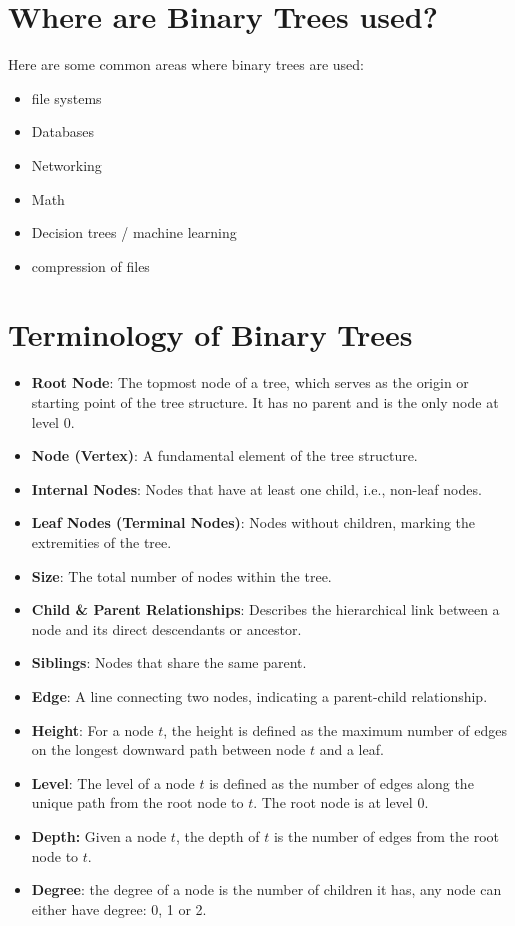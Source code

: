 \documentclass{report}
\begin{document}
\section{Where are Binary Trees used?}
Here are some common areas where binary trees are used:
\begin{itemize}
  \item file systems
  \item Databases
  \item Networking
  \item Math
  \item Decision trees / machine learning
  \item compression of files
\end{itemize}
\newpage
\section{Terminology of Binary Trees}
\begin{itemize}
  \item \textbf{Root Node}: The topmost node of a tree, which serves as the origin or starting point of the tree structure. It has no parent and is the only node at level 0.
  \item \textbf{Node (Vertex)}: A fundamental element of the tree structure.
  \item \textbf{Internal Nodes}: Nodes that have at least one child, i.e., non-leaf nodes.
  \item \textbf{Leaf Nodes (Terminal Nodes)}: Nodes without children, marking the extremities of the tree.
  \item \textbf{Size}: The total number of nodes within the tree.
  \item \textbf{Child \& Parent Relationships}: Describes the hierarchical link between a node and its direct descendants or ancestor.
  \item \textbf{Siblings}: Nodes that share the same parent.
  \item \textbf{Edge}: A line connecting two nodes, indicating a parent-child relationship.
  \item \textbf{Height}: For a node \(t\), the height is defined as the maximum number of edges on the longest downward path between node \(t\) and a leaf.
  \item \textbf{Level}: The level of a node \(t\) is defined as the number of edges along the unique path from the root node to \(t\). The root node is at level 0.
  \item \textbf{Depth:} Given a node $t$, the depth of $t$ is the number of edges from the root node to $t$.
  \item \textbf{Degree}: the degree of a node is the number of children it has, any node can either have degree: 0, 1 or 2.
\end{itemize}
\end{document}
